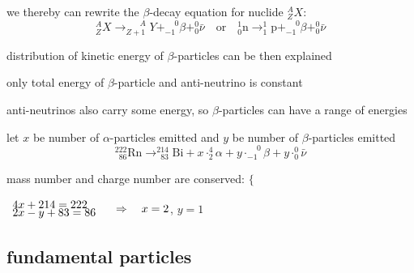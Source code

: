 \cmt we thereby can rewrite the $\beta$-decay equation for nuclide $_Z^A X$:
\begin{equation*}
\boxed{_Z^A X \longrightarrow _{Z+1}^{\phantom{1+}A} Y + _{-1}^{\phantom{+}0}\beta + _0^0 \bar{\nu}} \quad \text{or} \quad \boxed{_0^1 \text{n} \longrightarrow _1^1 \text{p} + _{-1}^{\phantom{+}0}\beta + _0^0 \bar{\nu}} \label{eqn:beta-decay}
\end{equation*}

\cmt distribution of kinetic energy of $\beta$-particles can be then explained

only total energy of $\beta$-particle and anti-neutrino is constant

anti-neutrinos also carry some energy, so $\beta$-particles can have a range of energies


\sol let $x$ be number of $\alpha$-particles emitted and $y$ be number of $\beta$-particles emitted
\begin{equation*}
	^{222}_{\phantom{2}86}\text{Rn} \longrightarrow ^{214}_{\phantom{2}83}\text{Bi} + x \cdot ^4_2 \alpha + y \cdot _{-1}^{\phantom{+}0}\beta + y \cdot _0^0 \bar{\nu}
\end{equation*}

\eqyskip mass number and charge number are conserved: $\Bigg\{$

\vspace*{-1.58\baselineskip}\hspace*{218pt} $\begin{array}{l}
4x + 214 = 222\\[-5pt]
2x - y + 83 = 86
\end{array} \quad \Rightarrow \quad x = 2$, $y=1$ \eoe



\subsection{fundamental particles}

